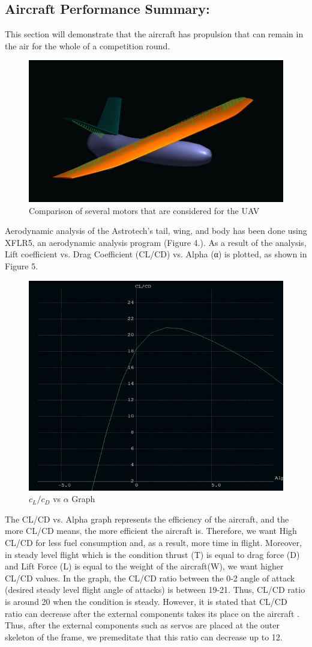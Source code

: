 \documentclass[12pt]{article}
\begin{document}
\subsection{Aircraft Performance Summary:}
This section will demonstrate that the aircraft has propulsion that can remain in the air for the whole of a competition round.
\begin{figure}[ht]
 	\centering
 	\includegraphics[width = .6\linewidth]{unnamed (4).png}
 	\caption{Comparison of several motors that are considered for the UAV}
        \label{fig:motorcmpr}
 \end{figure}
\FloatBarrier

\justify
Aerodynamic analysis of the Astrotech’s tail, wing, and body has been done using XFLR5, an aerodynamic analysis program (Figure 4.). As a result of the analysis, Lift coefficient vs. Drag Coefficient (CL/CD) vs. Alpha (α) is plotted, as shown in Figure 5. %

\begin{figure}[ht]
 	\centering
 	\includegraphics[width = .6\linewidth]{unnamed (5).png}
 	\caption{$c_L/c_D$ vs $\alpha$ Graph}
        \label{fig:motorcmpr}
 \end{figure}
\FloatBarrier
\justify
The CL/CD vs. Alpha graph represents the efficiency of the aircraft, and the more CL/CD means, the more efficient the aircraft is. Therefore, we want High CL/CD for less fuel consumption and, as a result, more time in flight. Moreover, in steady level flight which is the condition thrust (T) is equal to drag force (D) and Lift Force (L) is equal to the weight of the aircraft(W), we want higher CL/CD values. In the graph, the CL/CD ratio between the 0-2 angle of attack (desired steady level flight angle of attacks) is between 19-21.  Thus, CL/CD ratio is around 20 when the condition is steady. However, it is stated that CL/CD ratio can decrease after the external components takes its place on the aircraft \cite{Raymer2018}. Thus, after the external components such as servos are placed at the outer skeleton of the frame, we premeditate that this ratio can decrease up to 12. 
\end{document}
